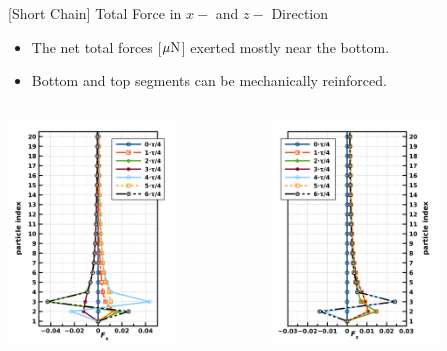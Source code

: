 \documentclass[t,presentation]{beamer}
\begin{document}
\begin{frame}[label={sec:orgb590468}]{[Short Chain] Total  Force  in \(x-\) and \(z-\) Direction}
\begin{itemize}
\item The net total forces [\(\mu\rm{N}\)] exerted mostly near the bottom.
\item Bottom and top segments can be mechanically reinforced.
\end{itemize}
\begin{columns}[c]
\begin{column}{.45\textwidth}
\centering
\includegraphics[width=1.75in]{figures/cXpvdf500FTS.png}\par
\end{column}
\begin{column}{.45\textwidth} %
\centering
\includegraphics[width=1.75in]{figures/cZpvdf500FTS.png}\par
\end{column}
\end{columns}
\end{frame}
\end{document}
